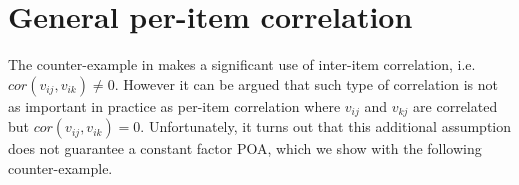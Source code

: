 \section{General per-item correlation}

The counter-example in \cite{roughgarden} makes a significant use of inter-item correlation, i.e. $cor(v_{ij},v_{ik})\neq 0$. However it can be argued that such type of correlation is not as important in practice as per-item correlation where $v_{ij}$ and $v_{kj}$ are correlated but $cor(v_{ij},v_{ik}) = 0$. Unfortunately, it turns out that this additional assumption does not guarantee a constant factor POA, which we show with the following counter-example.